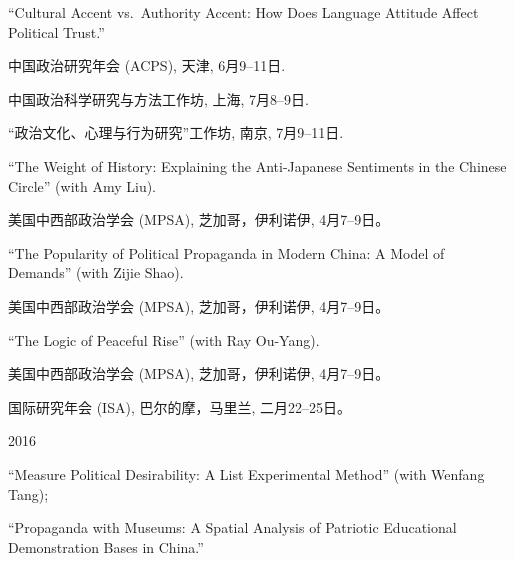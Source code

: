 \documentclass[10.5pt,]{article}
\providecommand{\tightlist}{%
	\setlength{\itemsep}{0pt}\setlength{\parskip}{0pt}}
\renewenvironment{itemize}{
	\begin{list}{}{
			\setlength{\leftmargin}{1.5em}
		}
	}{
	\end{list}
}
\begin{document}
\begin{itemize}
  \begin{itemize}
  \tightlist
  \item
    ``Cultural Accent vs.~Authority Accent: How Does Language Attitude
    Affect Political Trust.''

    \begin{itemize}
    \tightlist
    \item
      \footnotesize 中国政治研究年会 (ACPS), 天津, 6月9--11日.
    \item
      \footnotesize 中国政治科学研究与方法工作坊, 上海, 7月8--9日.
    \item
      \footnotesize ``政治文化、心理与行为研究''工作坊, 南京,
      7月9--11日.
    \end{itemize}
  \item
    ``The Weight of History: Explaining the Anti-Japanese Sentiments in
    the Chinese Circle'' (with Amy Liu).

    \begin{itemize}
    \tightlist
    \item
      \footnotesize 美国中西部政治学会 (MPSA), 芝加哥，伊利诺伊,
      4月7--9日。
    \end{itemize}
  \item
    ``The Popularity of Political Propaganda in Modern China: A Model of
    Demands'' (with Zijie Shao).

    \begin{itemize}
    \tightlist
    \item
      \footnotesize 美国中西部政治学会 (MPSA), 芝加哥，伊利诺伊,
      4月7--9日。
    \end{itemize}
  \item
    ``The Logic of Peaceful Rise'' (with Ray Ou-Yang).

    \begin{itemize}
    \tightlist
    \item
      \footnotesize 美国中西部政治学会 (MPSA), 芝加哥，伊利诺伊,
      4月7--9日。
    \item
      \footnotesize 国际研究年会 (ISA), 巴尔的摩，马里兰, 二月22--25日。
    \end{itemize}
  \end{itemize}
\item
  2016

  \begin{itemize}
  \tightlist
  \item
    ``Measure Political Desirability: A List Experimental Method'' (with
    Wenfang Tang);
  \item
    ``Propaganda with Museums: A Spatial Analysis of Patriotic
    Educational Demonstration Bases in China.''


\end{itemize}
\end{itemize}
\end{document}
